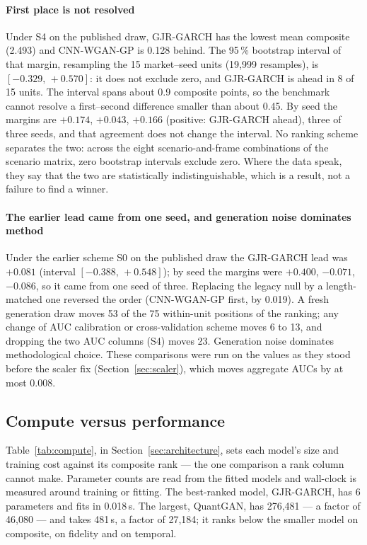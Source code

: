 \documentclass[11pt,a4paper]{article}
\makeatletter
\DeclareRobustCommand{\_}{\ifmmode\nfss@text{\textunderscore}\else\textunderscore\allowbreak\fi}
\makeatother
\begin{document}
\paragraph{First place is not resolved} Under S4 on the published draw, GJR-GARCH has the lowest mean composite (2.493) and CNN-WGAN-GP is 0.128 behind. The 95\,\% bootstrap interval of that margin, resampling the 15 market--seed units (19{,}999 resamples), is $[-0.329,\,+0.570]$: it does not exclude zero, and GJR-GARCH is ahead in 8 of 15 units. The interval spans about 0.9 composite points, so the benchmark cannot resolve a first--second difference smaller than about 0.45. By seed the margins are $+0.174$, $+0.043$, $+0.166$ (positive: GJR-GARCH ahead), three of three seeds, and that agreement does not change the interval. No ranking scheme separates the two: across the eight scenario-and-frame combinations of the scenario matrix, zero bootstrap intervals exclude zero. Where the data speak, they say that the two are statistically indistinguishable, which is a result, not a failure to find a winner.

\paragraph{The earlier lead came from one seed, and generation noise dominates method} Under the earlier scheme S0 on the published draw the GJR-GARCH lead was $+0.081$ (interval $[-0.388,\,+0.548]$); by seed the margins were $+0.400$, $-0.071$, $-0.086$, so it came from one seed of three. Replacing the legacy null by a length-matched one reversed the order (CNN-WGAN-GP first, by 0.019). A fresh generation draw moves 53 of the 75 within-unit positions of the ranking; any change of AUC calibration or cross-validation scheme moves 6 to 13, and dropping the two AUC columns (S4) moves 23. Generation noise dominates methodological choice. These comparisons were run on the values as they stood before the scaler fix (Section~\ref{sec:scaler}), which moves aggregate AUCs by at most 0.008.

\subsection{Compute versus performance}
\label{sec:compute}
Table~\ref{tab:compute}, in Section~\ref{sec:architecture}, sets each model's size and training cost against its composite rank --- the one comparison a rank column cannot make. Parameter counts are read from the fitted models and wall-clock is measured around training or fitting. The best-ranked model, GJR-GARCH, has 6 parameters and fits in 0.018\,s. The largest, QuantGAN, has 276,481 --- a factor of 46,080 --- and takes 481\,s, a factor of 27,184; it ranks below the smaller model on composite, on fidelity and on temporal.
\end{document}
